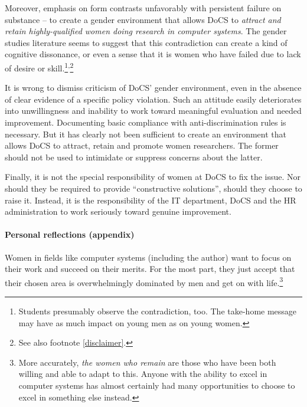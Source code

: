 \documentclass[a4paper,10pt,twocolumn]{article}
\begin{document}
Moreover, emphasis on form contrasts unfavorably with persistent
failure on substance -- to create a gender environment that allows
DoCS to \emph{attract and retain highly-qualified women doing research
in computer systems}.  The gender studies literature seems to suggest
that this contradiction can create a kind of cognitive dissonance, or
even a sense that it is women who have failed due to lack of desire or
skill.\footnote{Students presumably observe the contradiction, too.
The take-home message may have as much impact on young men as on young
women.}\textsuperscript{,}\footnote{See also footnote
\footnotesize{\ref{disclaimer}}.}


It is wrong to dismiss criticism of DoCS' gender environment, even in
the absence of clear evidence of a specific policy violation.  Such an
attitude easily deteriorates into unwillingness and inability to work
toward meaningful evaluation and needed improvement.  Documenting
basic compliance with anti-discrimination rules is necessary.  But it
has clearly not been sufficient to create an environment that allows
DoCS to attract, retain and promote women researchers.  The former
should not be used to intimidate or suppress concerns about the
latter.

Finally, it is not the special responsibility of women at DoCS to fix
the issue.  Nor should they be required to provide ``constructive
solutions'', should they choose to raise it.  Instead, it is the
responsibility of the IT department, DoCS and the HR administration to
work seriously toward genuine improvement.



\paragraph*{Personal reflections (appendix)}

Women in fields like computer systems (including the author) want to
focus on their work and succeed on their merits.  For the most part,
they just accept that their chosen area is overwhelmingly dominated by
men and get on with life.\footnote{More accurately, \emph{the women
who remain} are those who have been both willing and able to adapt to
this. Anyone with the ability to excel in computer systems has almost
certainly had many opportunities to choose to excel in something else
instead.}
\end{document}
